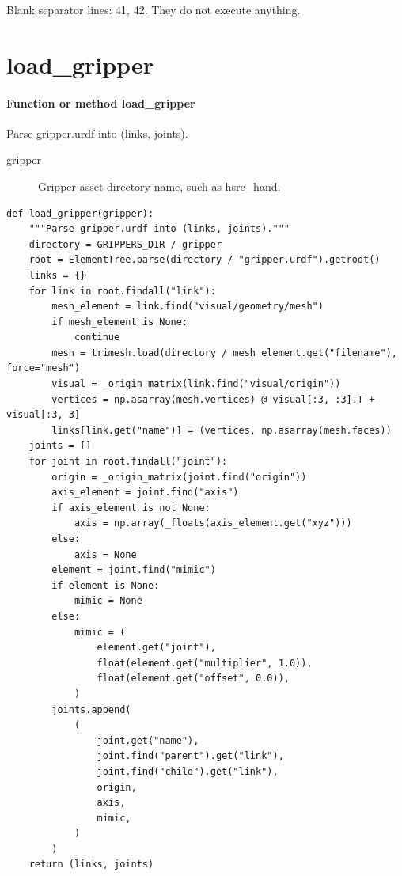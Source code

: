 \documentclass[11pt,a4paper]{book}
\begin{document}
Blank separator lines: 41, 42. They do not execute anything.

\section{load\_gripper}

\paragraph{Function or method load\_gripper}
Parse gripper.urdf into (links, joints).

\begin{description}
\item[gripper] Gripper asset directory name, such as hsrc\_hand.
\end{description}

\begin{lstlisting}[firstnumber=43]
def load_gripper(gripper):
    """Parse gripper.urdf into (links, joints)."""
    directory = GRIPPERS_DIR / gripper
    root = ElementTree.parse(directory / "gripper.urdf").getroot()
    links = {}
    for link in root.findall("link"):
        mesh_element = link.find("visual/geometry/mesh")
        if mesh_element is None:
            continue
        mesh = trimesh.load(directory / mesh_element.get("filename"), force="mesh")
        visual = _origin_matrix(link.find("visual/origin"))
        vertices = np.asarray(mesh.vertices) @ visual[:3, :3].T + visual[:3, 3]
        links[link.get("name")] = (vertices, np.asarray(mesh.faces))
    joints = []
    for joint in root.findall("joint"):
        origin = _origin_matrix(joint.find("origin"))
        axis_element = joint.find("axis")
        if axis_element is not None:
            axis = np.array(_floats(axis_element.get("xyz")))
        else:
            axis = None
        element = joint.find("mimic")
        if element is None:
            mimic = None
        else:
            mimic = (
                element.get("joint"),
                float(element.get("multiplier", 1.0)),
                float(element.get("offset", 0.0)),
            )
        joints.append(
            (
                joint.get("name"),
                joint.find("parent").get("link"),
                joint.find("child").get("link"),
                origin,
                axis,
                mimic,
            )
        )
    return (links, joints)


\end{lstlisting}
\end{document}
